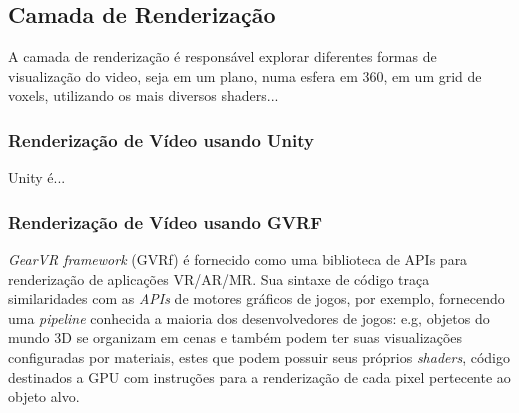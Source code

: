 \subsection{Camada de Renderização} \label{sec-arch-subsec-render-layer}

A camada de renderização é responsável explorar diferentes formas de visualização do video, seja em um plano, numa esfera em 360, em um grid de voxels, utilizando os mais diversos shaders...


\subsubsection{Renderização de Vídeo usando Unity}


Unity é...


\subsubsection{Renderização de Vídeo usando GVRF}

\textit{GearVR framework} (GVRf) é fornecido como uma biblioteca de APIs para renderização de aplicações VR/AR/MR. Sua sintaxe de código traça similaridades com as \textit{APIs} de motores gráficos de jogos, por exemplo, fornecendo uma \textit{pipeline} conhecida a maioria dos desenvolvedores de jogos: e.g, objetos do mundo 3D se organizam em cenas e também podem ter suas visualizações configuradas por materiais, estes que podem possuir seus próprios \textit{shaders}, código destinados a GPU com instruções para a renderização de cada pixel pertecente ao objeto alvo.


